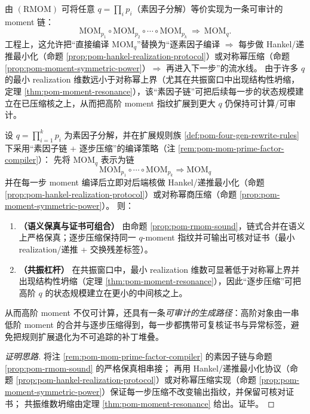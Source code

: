 \begin{remark}\label{rem:pom-mom-prime-factor-compiler}
由 \((\mathrm{RMOM})\) 可将任意 \(q=\prod_i p_i\)（素因子分解）等价实现为一条可审计的 moment 链：
\[
\mathrm{MOM}_{p_1}\circ\mathrm{MOM}_{p_2}\circ\cdots\circ\mathrm{MOM}_{p_k}
\ \Rightarrow\ \mathrm{MOM}_q.
\]
工程上，这允许把“直接编译 \(\mathrm{MOM}_q\)”替换为“逐素因子编译 \(\Rightarrow\) 每步做 Hankel/递推最小化（命题 \ref{prop:pom-hankel-realization-protocol}）或对称幂压缩（命题 \ref{prop:pom-moment-symmetric-power}）\(\Rightarrow\) 再进入下一步”的流水线。
由于许多 \(q\) 的最小 realization 维数远小于对称幂上界（尤其在共振窗口中出现结构性坍缩，定理 \ref{thm:pom-moment-resonance}），该“素因子链”可把后续每一步的状态规模建立在已压缩核之上，从而把高阶 moment 指纹扩展到更大 \(q\) 仍保持可计算/可审计。
\end{remark}

\begin{theorem}\label{thm:pom-prime-factor-moment-compiler-resonance}
设 \(q=\prod_{i=1}^{k}p_i\) 为素因子分解，并在扩展规则族 \ref{def:pom-four-gen-rewrite-rules} 下采用“素因子链 + 逐步压缩”的编译策略（注 \ref{rem:pom-mom-prime-factor-compiler}）：
先将 \(\mathrm{MOM}_q\) 表示为链
\[
\mathrm{MOM}_{p_1}\circ\cdots\circ \mathrm{MOM}_{p_k}\Rightarrow \mathrm{MOM}_q
\]
并在每一步 moment 编译后立即对后端核做 Hankel/递推最小化（命题 \ref{prop:pom-hankel-realization-protocol}）或对称幂商压缩（命题 \ref{prop:pom-moment-symmetric-power}）。
则：
\begin{enumerate}
  \item \textbf{（语义保真与证书可组合）} 由命题 \ref{prop:pom-rmom-sound}，链式合并在语义上严格保真；逐步压缩保持同一 \(q\)-moment 指纹并可输出可核对证书（最小 realization/递推 + 交换残差标签）。
  \item \textbf{（共振杠杆）} 在共振窗口中，最小 realization 维数可显著低于对称幂上界并出现结构性坍缩（定理 \ref{thm:pom-moment-resonance}），因此“逐步压缩”可把高阶 \(q\) 的状态规模建立在更小的中间核之上。
\end{enumerate}
从而高阶 moment 不仅可计算，还具有一条\emph{可审计的生成路径}：高阶对象由一串低阶 moment 的合并与逐步压缩得到，每一步都携带可复核证书与异常标签，避免把规则扩展退化为不可追踪的补丁堆叠。
\end{theorem}

\begin{proof}[证明思路]
将注 \ref{rem:pom-mom-prime-factor-compiler} 的素因子链与命题 \ref{prop:pom-rmom-sound} 的严格保真相串接；
再用 Hankel/递推最小化协议（命题 \ref{prop:pom-hankel-realization-protocol}）或对称幂压缩实现（命题 \ref{prop:pom-moment-symmetric-power}）保证每一步压缩不改变输出指纹，并保留可核对证书；
共振维数坍缩由定理 \ref{thm:pom-moment-resonance} 给出。证毕。
\end{proof}

